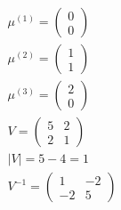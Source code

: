\begin{enumerate}[label=\color{red}\textbf{\arabic*)}, leftmargin=*]
\begin{enumerate}[label=\color{red}\alph*)]
		$\begin{array}{l}
			\mu^{(1)}=\begin{pmatrix}
				0\\
				0
			\end{pmatrix}\\
			\mu^{(2)}=\begin{pmatrix}
				1\\
				1
			\end{pmatrix}\\
			\mu^{(3)}=\begin{pmatrix}
				2\\
				0
			\end{pmatrix}\\
			V=\begin{pmatrix}
				5 & 2\\
				2 & 1
			\end{pmatrix}\\
			\left|V\right|=5-4=1\\
			V^{-1}=\begin{pmatrix}
				1 &-2\\
				-2 & 5
			\end{pmatrix}
		\end{array}$
		

\end{enumerate}
\end{enumerate}
